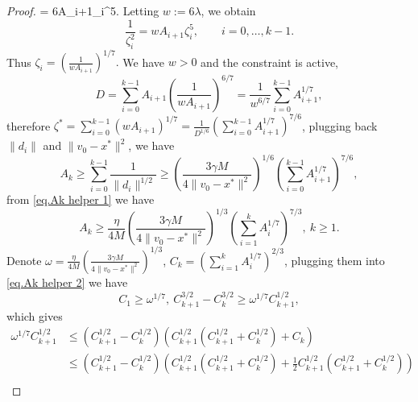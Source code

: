 \documentclass{article}
\numberwithin{equation}{section}
\numberwithin{equation}{section}
\begin{document}
\begin{proof}
    =
    6\lambda A_{i+1}\zeta_i^5. \) Letting \(w:=6\lambda\), we obtain
    \begin{equation*}
        \frac{1}{\zeta_i^2}
        =
        w A_{i+1}\zeta_i^5,
        \qquad i=0,\ldots,k-1.
    \end{equation*}
    Thus \(
    \zeta_i
    =
    \left(
    \frac{1}{wA_{i+1}}
    \right)^{1/7}. \) We have $w>0$ and the constraint is active,
    \begin{equation*}
        D=\sum_{i=0}^{k-1} A_{i+1}\left(\frac{1}{w A_{i+1}}\right)^{6 / 7}=\frac{1}{w^{6 / 7}} \sum_{i=0}^{k-1} A_{i+1}^{1 / 7},
    \end{equation*}
    therefore $\zeta^*=\sum_{i=0}^{k-1}\left(w A_{i+1}\right)^{1 / 7}=\frac{1}{D^{1 / 6}}\left(\sum_{i=0}^{k-1} A_{i+1}^{1 / 7}\right)^{7 / 6}$, plugging back $\|d_i\| $ and $ \|v_0-x^*\|^2$, we have
    \begin{equation*}
        A_k\geq\sum_{i=0}^{k-1}\frac{1}{\|d_i\|^{1/2}} \geq \left (\frac{3\gamma M}{4\|v_0-x^*\|^2}\right)^{1/6} \left(\sum_{i=0}^{k-1} A_{i+1}^{1 / 7}\right)^{7 / 6},
    \end{equation*}
    from \eqref{eq.Ak helper 1} we have
    \begin{equation}
        \label{eq.Ak helper 2}
        A_k \geq \frac{\eta}{4M}\left (\frac{3\gamma M}{4\|v_0-x^*\|^2}\right)^{1/3} \left(\sum_{i=1}^{k} A_{i}^{1 / 7}\right)^{7 / 3}, \ k\geq 1.
    \end{equation}
    Denote $\omega = \frac{\eta}{4M}\left (\frac{3\gamma M}{4\|v_0-x^*\|^2}\right)^{1/3}$, $C_k =\left(\sum_{i=1}^k A_i^{1 / 7}\right)^{2 / 3}$, plugging them into \eqref{eq.Ak helper 2} we have
    \begin{equation*}
        C_1\geq\omega^{1/7},\ C_{k+1}^{3 / 2}-C_k^{3 / 2} \geq \omega^{1 / 7} C_{k+1}^{1 / 2},
    \end{equation*}
    which gives
    \begin{equation*}
        \begin{aligned}
            \omega^{1 / 7} C_{k+1}^{1 / 2} & \leq\left(C_{k+1}^{1 / 2}-C_k^{1 / 2}\right)\left(C_{k+1}^{1 / 2}\left(C_{k+1}^{1 / 2}+C_k^{1 / 2}\right)+C_k\right)                                                                 \\
                                           & \leq\left(C_{k+1}^{1 / 2}-C_k^{1 / 2}\right)\left(C_{k+1}^{1 / 2}\left(C_{k+1}^{1 / 2}+C_k^{1 / 2}\right)+\frac{1}{2} C_{k+1}^{1 / 2}\left(C_{k+1}^{1 / 2}+C_k^{1 / 2}\right)\right) \\

\end{aligned}
\end{equation*}
\end{proof}
\end{document}
